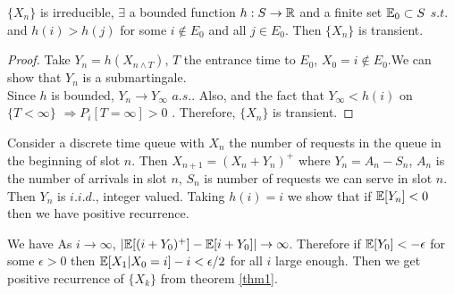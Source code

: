 \documentclass[all-lectures.tex]{subfiles}
\begin{document}
\begin{thm}
$\{X_n\}$ is irreducible, $\exists$ a bounded function $h:S \to \mathbb{R}$ and a finite set $\mathbb{E}_0 \subset S$ $s.t.$  
and $h(i) > h(j)$ for some $i \notin E_0$ and all $j \in E_0$. Then $\{X_n\}$ is transient.
\end{thm}
\begin{proof}
Take $Y_n = h(X_{n \wedge T})$, $T$ the entrance time to $E_0$, $X_0 = i \notin E_0$.We can show that $Y_n$ is a submartingale.\\
Since $h$ is bounded, $Y_n \to Y_\infty$ \quad $a.s.$. Also,
and the fact that $Y_\infty < h(i)$ on $\{T < \infty\}$  $\Rightarrow P_i[T=\infty] >0$ .
Therefore, $\{X_n\}$ is transient.
\end{proof}
\begin{exmp}
Consider a discrete time queue with $X_n$ the number of requests in the queue in the beginning of slot $n$. Then $X_{n+1} = (X_n + Y_n)^+$ where $Y_n = A_n - S_n$, $A_n$ is the number of arrivals in slot $n$, $S_n$ is number of requests we can serve in slot $n$. Then $Y_n$ is $i.i.d.$, integer valued.
Taking $h(i)=i$ we show that if $\mathbb{E}[Y_n] < 0$ then we have positive recurrence.

We have
As $i \to \infty$, $|\mathbb{E}[(i+Y_0)^+] - \mathbb{E}[i+Y_0]| \to \infty$. Therefore if $\mathbb{E}[Y_0] < -\epsilon$ for some $\epsilon > 0$ then $\mathbb{E}[X_1|X_0 = i]-i < \epsilon/2$ for all $i$ large enough. Then we get positive recurrence of $\{X_k\}$ from theorem \ref{thm1}.
\end{exmp}
\end{document}
